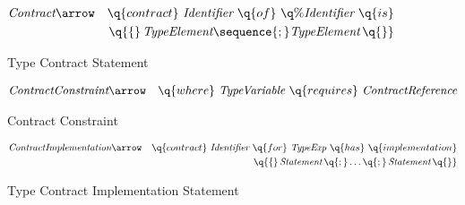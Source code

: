 \begin{figure}[htbp]
\begin{eqnarray*}
\emph{Contract}&\arrow&\q{contract}\ \emph{Identifier}\ \q{of}\ \q{\%}\emph{Identifier}\ \q{is}\\
&&\q{\{}\,\emph{TypeElement}\sequence{;}\emph{TypeElement}\,\q{\}}
\end{eqnarray*}
\caption{Type Contract Statement}
\label{ContractFig}
\end{figure}

\begin{figure}[htbp]
\begin{eqnarray*}
\emph{ContractConstraint}&\arrow&\q{where}\ \emph{TypeVariable}\ \q{requires}\ \emph{ContractReference}
\end{eqnarray*}
\caption{Contract Constraint}
\label{contractConstraint}
\end{figure}

\begin{figure}[htbp]
\begin{eqnarray*}
\emph{ContractImplementation}&\arrow&\q{contract}\ \emph{Identifier}\ \q{for}\ \emph{TypeExp}\ \q{has}\ \q{implementation}\\
&&\q{\{}\,\emph{Statement}\,\q{;}\ldots\q{;}\,\emph{Statement}\,\q{\}}
\end{eqnarray*}
\caption{Type Contract Implementation Statement}
\label{ContractImplementationFig}
\end{figure}


